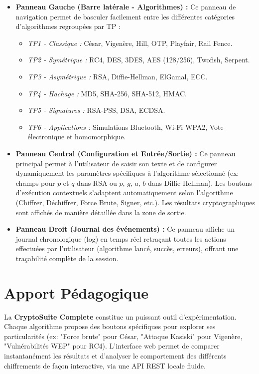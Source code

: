 \documentclass[12pt,a4paper]{report}
\begin{document}
\begin{itemize}
    \item \textbf{Panneau Gauche (Barre latérale - Algorithmes) :} Ce panneau de navigation permet de basculer facilement entre les différentes catégories d'algorithmes regroupées par TP :
    \begin{itemize}
        \item \textit{TP1 - Classique :} César, Vigenère, Hill, OTP, Playfair, Rail Fence.
        \item \textit{TP2 - Symétrique :} RC4, DES, 3DES, AES (128/256), Twofish, Serpent.
        \item \textit{TP3 - Asymétrique :} RSA, Diffie-Hellman, ElGamal, ECC.
        \item \textit{TP4 - Hachage :} MD5, SHA-256, SHA-512, HMAC.
        \item \textit{TP5 - Signatures :} RSA-PSS, DSA, ECDSA.
        \item \textit{TP6 - Applications :} Simulations Bluetooth, Wi-Fi WPA2, Vote électronique et homomorphique.
    \end{itemize}
    
    \item \textbf{Panneau Central (Configuration et Entrée/Sortie) :} 
    Ce panneau principal permet à l'utilisateur de saisir son texte et de configurer dynamiquement les paramètres spécifiques à l'algorithme sélectionné (ex: champs pour $p$ et $q$ dans RSA ou $p$, $g$, $a$, $b$ dans Diffie-Hellman). Les boutons d'exécution contextuels s'adaptent automatiquement selon l'algorithme (Chiffrer, Déchiffrer, Force Brute, Signer, etc.). Les résultats cryptographiques sont affichés de manière détaillée dans la zone de sortie.
    
    \item \textbf{Panneau Droit (Journal des événements) :}
    Ce panneau affiche un journal chronologique (log) en temps réel retraçant toutes les actions effectuées par l'utilisateur (algorithme lancé, succès, erreurs), offrant une traçabilité complète de la session.
\end{itemize}

\section{Apport Pédagogique}
La \textbf{CryptoSuite Complete} constitue un puissant outil d'expérimentation. Chaque algorithme propose des boutons spécifiques pour explorer ses particularités (ex: "Force brute" pour César, "Attaque Kasiski" pour Vigenère, "Vulnérabilités WEP" pour RC4). L'interface web permet de comparer instantanément les résultats et d'analyser le comportement des différents chiffrements de façon interactive, via une API REST locale fluide.
\end{document}
